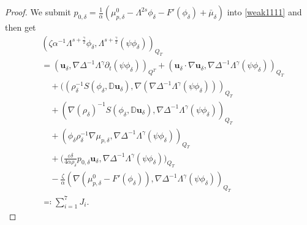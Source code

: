 \documentclass[reqno,a4paper,11pt]{amsart}
\theoremstyle{plain}
\numberwithin{equation}{section}
\begin{document}
\begin{proof}
				We  submit  $p_{0,\delta}=\frac{1}{\alpha}(\mu_{p,\delta}^{0}-\Lambda^{2s}\phi_{\delta}-F'(\phi_{\delta})+\bar{\mu}_{\delta})$ into \eqref{weak1111} and then get
				\begin{align}
					& (\zeta\alpha^{-1}\Lambda^{s+\frac{\gamma}{2}}\phi_{\delta},\Lambda^{s+\frac{\gamma}{2}}(\psi\phi_{\delta}))_{Q_{T}}
					\nonumber \\& =%
					(\mathbf{u}_{\delta},\nabla\Delta^{-1}\Lambda^{\gamma}\partial_t (\psi\phi_{\delta}))_{Q^{T}}
					+(\mathbf{u}_{\delta}\cdot\nabla
					\mathbf{u}_{\delta},\nabla\Delta^{-1}\Lambda^{\gamma}(\psi\phi_{\delta}))_{Q_{T}}
					\nonumber \\&\quad+((\rho_{\delta}^{-1}S(\phi_{\delta},\mathbb{ D}\mathbf{u}_{\delta}),\nabla(\nabla\Delta^{-1}\Lambda^{\gamma}(\psi\phi_{\delta})))_{Q_{T}}
					\nonumber \\&\quad+(\nabla(\rho_{\delta})^{-1}S(\phi_{\delta},\mathbb{ D}\mathbf{u}_{\delta}),\nabla\Delta^{-1}\Lambda^{\gamma}(\psi\phi_{\delta}))_{Q_{T}}
					\nonumber\\&\quad +(\phi_{\delta}\rho_{\delta}^{-1} \nabla \mu_{p,\delta},\nabla\Delta^{-1}\Lambda^{\gamma}(\psi\phi_{\delta}))_{Q_{T}}
					\nonumber\\& \quad+\bigg(\frac{\varepsilon\delta}{4\alpha\rho_{\delta}}  p_{0,\delta} \mathbf{u}_{\delta},\nabla\Delta^{-1}\Lambda^{\gamma}(\psi\phi_{\delta})\bigg)_{Q_{T}}
					\nonumber \\&\quad-\frac{\zeta}{\alpha}(\nabla(\mu_{p,\delta}^{0}-F'(\phi_{\delta})),\nabla\Delta^{-1}\Lambda^{\gamma}(\psi\phi_{\delta}))_{Q_{T}}
					\nonumber \\&\eqqcolon\sum_{i=1}^{7}J_{i}.\label{lemh55-5}
				\end{align}
				
				
				

\end{proof}
\end{document}
